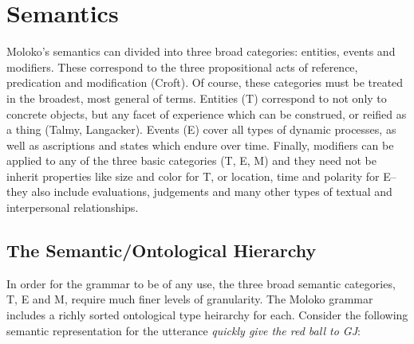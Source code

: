 \section{Semantics}

Moloko's semantics can divided into three broad categories: entities, events and modifiers. These correspond to the three propositional acts of reference, predication and modification (Croft). Of course, these categories must be treated in the broadest, most general of terms. Entities (T) correspond to not only to concrete objects, but any facet of experience which can be construed, or reified as a thing (Talmy, Langacker). Events (E) cover all types of dynamic processes, as well as ascriptions and states which endure over time. Finally, modifiers can be applied to any of the three basic categories (T, E, M) and they need not be inherit properties like size and color for T, or location, time and polarity for E--they also include evaluations, judgements and many other types of textual and interpersonal relationships. 
\subsection{The Semantic/Ontological Hierarchy} \label{sec-Ontology}
In order for the grammar to be of any use, the three broad semantic categories, T, E and M, require much finer levels of granularity. The Moloko grammar includes a richly sorted ontological type heirarchy for each. Consider the following semantic representation for the utterance \emph{quickly give the red ball to GJ}: 
\vspace{-1.5em} %

